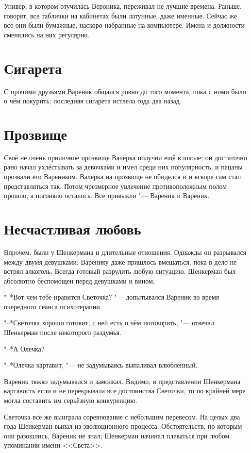 Универ, в котором отучилась Вероника, переживал не лучшие времена.
Раньше, говорят, все таблички на кабинетах были латунные, даже именные.
Сейчас же все они были бумажные, наскоро набранные на компьютере.
Имена и должности сменялись на них регулярно.

\section{Сигарета}

С прочими друзьями Вареник общался ровно до того момента, пока с ними было о чём покурить;
последняя сигарета истлела года два назад. 

\section{Прозвище}

Своё не очень приличное прозвище Валерка получил ещё в школе;
он достаточно рано начал ухлёстывать за девочками и имел среди них популярность, и пацаны прозвали его Вареником.
Валерка на прозвище не обиделся и и вскоре сам стал представляться так.
Потом чрезмерное увлечение противоположным полом прошло, а погоняло осталось.
Все привыкли "--- Вареник и Вареник.

\section{Несчастливая любовь}

Впрочем, были у Шенкермана и длительные отношения.
Однажды он разрывался между двумя девушками;
Варенику даже пришлось вмешаться, пока в дело не встрял алкоголь.
Всегда готовый разрулить любую ситуацию, Шенкерман был абсолютно беспомощен перед девушками и вином.

"--*Вот чем тебе нравится Светочка? "--- допытывался Вареник во время очередного сеанса психотерапии.

"--*Светочка хорошо готовит, с ней есть о чём поговорить, "--- отвечал Шенкерман после некоторого раздумья.

"--*А Олечка?

"--*Олечка картавит, "--- не задумываясь выпаливал влюблённый.

Вареник тяжко задумывался и замолкал.
Видимо, в представлении Шенкермана картавость если и не перекрывала все достоинства Светочки, то по крайней мере могла составить им серьёзную конкуренцию.

Светочка всё же выиграла соревнование с небольшим перевесом.
На целых два года Шенкерман выпал из эволюционного процесса.
Обстоятельств, по которым они разошлись, Вареник не знал;
Шенкерман начинал плеваться при любом упоминании имени <<Света>>.

